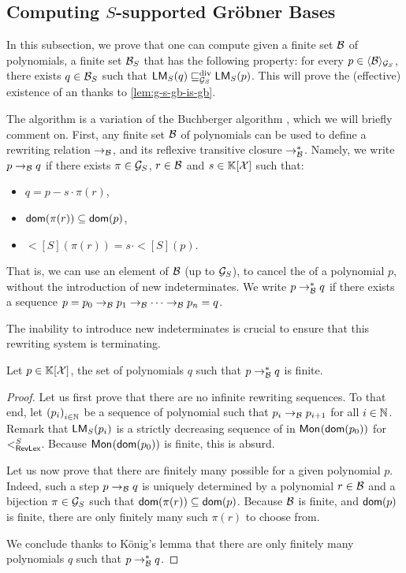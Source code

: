 \subsection{Computing $S$-supported Gröbner Bases}
\label{subsec:weakgbcomp}

\AP In this subsection, we prove that one can compute given a finite set
$\Basis$ of polynomials, a finite set $\Basis_S$ that has the following
property: for every $p \in \gen{\Basis}{\group_S}$, there exists $q \in
\Basis_S$ such that $\lm[S](q) \gdivleq[\group_S] \lm[S](p)$. This will prove
the (effective) existence of an 
thanks to \cref{lem:g-s-gb-is-gb}.

\AP The algorithm is a variation of the Buchberger algorithm \cite{BUCH76},
which we will briefly comment on. First, any finite set $\Basis$ of polynomials
can be used to define a rewriting relation $\reducstep{\Basis}$, and its
reflexive transitive closure $\reduc{\Basis}$.
Namely, we write $p \reducstep{\Basis} q$
if there exists $\pi \in \group_S$, $r \in \Basis$ and $s \in \poly{\K}{\X}$
such that:
\begin{itemize}
    \item $q = p - s \cdot \pi(r)$,
    \item $\dom(\pi(r)) \subseteq \dom(p)$,
    \item $\lt[S](\pi(r)) = s \cdot \lt[S](p)$.
\end{itemize}
That is, we can use an element of $\Basis$ (up to $\group_S$),
to cancel the 
of a polynomial $p$, without the introduction of new indeterminates.
We write $p \reduc{\Basis} q$ if there exists a
sequence $p = p_0 \reducstep{\Basis} p_1 \reducstep{\Basis} \cdots
\reducstep{\Basis} p_n = q$. 

The inability to introduce new indeterminates is crucial
to ensure that this rewriting system is terminating.
\begin{lemma}
    \label{lem:finite-remainders}
    Let $p \in \poly{\K}{\X}$,
    the set of polynomials $q$ such that $p \reduc{\Basis} q$
    is finite.
\end{lemma}
\begin{proof}
    Let us first prove that there are no infinite rewriting sequences.
    To that end, let $\seqof{p_i}[i \in \N]$ be a sequence of 
    polynomial such that $p_i \reducstep{\Basis} p_{i+1}$
    for all $i \in \N$.
    Remark that $\lm[S](p_i)$ is a strictly decreasing 
    sequence of  in $\mon{\dom(p_0)}$
    for $\revlex[S]$. Because $\mon{\dom(p_0)}$ is finite,
    this is absurd.

    Let us now prove that there are finitely many 
    possible  for a given polynomial $p$.
    Indeed, such a step $p \reducstep{\Basis} q$ is
    uniquely determined by a polynomial $r \in \Basis$
    and a bijection $\pi \in \group_S$ such that
    $\dom(\pi(r)) \subseteq \dom(p)$. Because $\Basis$ is finite,
    and $\dom(p)$ is finite, there are only finitely many such $\pi(r)$
    to choose from.

    We conclude thanks to König's lemma that there are only finitely
    many polynomials $q$ such that $p \reduc{\Basis} q$.
\end{proof}

